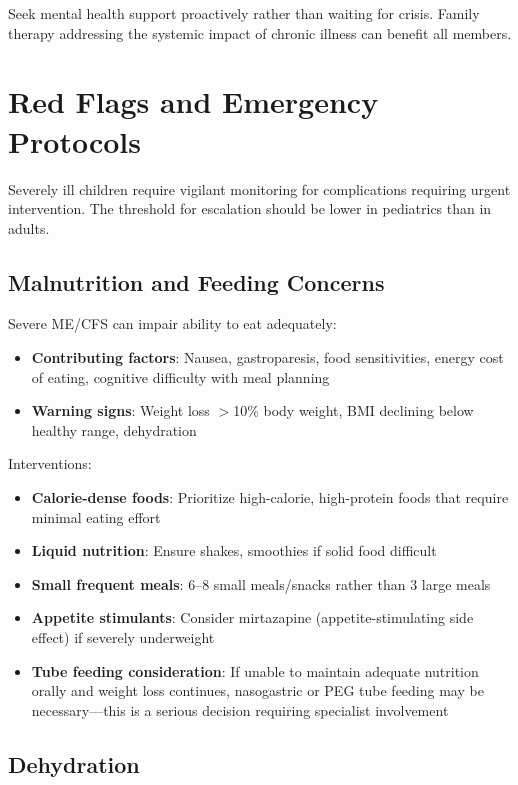 Seek mental health support proactively rather than waiting for crisis. Family therapy addressing the systemic impact of chronic illness can benefit all members.

\section{Red Flags and Emergency Protocols}
\label{sec:ped-severe-red-flags}

Severely ill children require vigilant monitoring for complications requiring urgent intervention. The threshold for escalation should be lower in pediatrics than in adults.

\subsection{Malnutrition and Feeding Concerns}

Severe ME/CFS can impair ability to eat adequately:

\begin{itemize}
    \item \textbf{Contributing factors}: Nausea, gastroparesis, food sensitivities, energy cost of eating, cognitive difficulty with meal planning
    \item \textbf{Warning signs}: Weight loss $>$10\% body weight, BMI declining below healthy range, dehydration
\end{itemize}

Interventions:
\begin{itemize}
    \item \textbf{Calorie-dense foods}: Prioritize high-calorie, high-protein foods that require minimal eating effort
    \item \textbf{Liquid nutrition}: Ensure shakes, smoothies if solid food difficult
    \item \textbf{Small frequent meals}: 6--8 small meals/snacks rather than 3 large meals
    \item \textbf{Appetite stimulants}: Consider mirtazapine (appetite-stimulating side effect) if severely underweight
    \item \textbf{Tube feeding consideration}: If unable to maintain adequate nutrition orally and weight loss continues, nasogastric or PEG tube feeding may be necessary---this is a serious decision requiring specialist involvement
\end{itemize}

\subsection{Dehydration}

